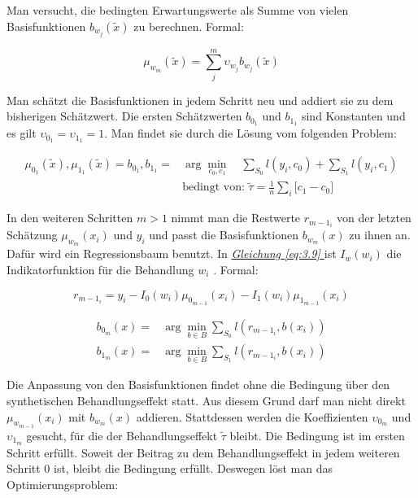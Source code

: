 \documentclass[12pt,a4paper,twoside]{scrartcl}
\numberwithin{equation}{section}
\renewcommand*{\refeq}[1]{\emph{\hyperref[#1]{Gleichung \ref*{#1} }}}
\begin{document}
\noindent
Man versucht, die bedingten Erwartungswerte als Summe von vielen Basisfunktionen $b_{w_j}(\tilde{x})$ zu berechnen. Formal:\par

\begin{equation}\label{eq:3.7}
 \mu_{w_m}(\tilde{x}) = \sum_j^m \upsilon_{w_j}b_{w_j}(\tilde{x})
\end{equation}

\noindent
Man schätzt die Basisfunktionen in jedem Schritt neu und addiert sie zu dem bisherigen Schätzwert. Die ersten Schätzwerten $b_{0_1}$ und $b_{1_1}$ sind Konstanten und es gilt $\upsilon_{0_1} = \upsilon_{1_1} = 1$. Man findet sie durch die Lösung vom folgenden Problem\cite{schuler2017synth}: \par 

\begin{equation}\label{eq:3.8}
\begin{split}
	\mu_{0_1}(\tilde{x}),\mu_{1_1}(\tilde{x}) = b_{0_1},b_{1_1} = &\arg\min_{c_0,c_1} \quad \sum_{S_0} l(y_i,c_0) + \sum_{S_1} l(y_i,c_1)\\
 &\text{bedingt von: } \tilde{\tau} = \frac{1}{n} \sum_i \big [c_1 - c_0 \big ]
\end{split}
\end{equation}

\noindent
In den weiteren Schritten $m>1$ nimmt man die Restwerte $r_{{m-1}_i}$ von der letzten Schätzung $\mu_{w_m}(x_i)$ und $y_i$ und passt die Basisfunktionen $b_{w_m}(x)$ zu ihnen an. Dafür wird ein Regressionsbaum benutzt. In \refeq{eq:3.9} ist $I_w(w_i)$ die Indikatorfunktion für die Behandlung $w_i$ \cite{schuler2017synth}. Formal:\par

\begin{equation}\label{eq:3.9}
r_{{m-1}_i} = y_i - I_0(w_i)\mu_{0_{m-1}}(x_i)-I_1(w_i)\mu_{1_{m-1}}(x_i)
\end{equation}

\begin{equation}\label{eq:3.10}
\begin{split}
	 b_{0_m}(x) = &\arg\min_{b \in B} \sum_{S_0} l(r_{{m-1}_i},b(x_i))\\
	 b_{1_m}(x) = &\arg\min_{b \in B} \sum_{S_1} l(r_{{m-1}_i},b(x_i))
\end{split}
\end{equation}

\noindent
Die Anpassung von den Basisfunktionen findet ohne die Bedingung über den synthetischen Behandlungseffekt statt. Aus diesem Grund darf man nicht direkt $\mu_{w_{m-1}}(x_i)$ mit $b_{w_m}(x)$ addieren. Stattdessen werden die Koeffizienten $\upsilon_{0_m}$ und $\upsilon_{1_m}$ gesucht, für die der Behandlungseffekt $\tilde{\tau}$ bleibt. Die Bedingung ist im ersten Schritt erfüllt. Soweit der Beitrag zu dem Behandlungseffekt in jedem weiteren Schritt $0$ ist, bleibt die Bedingung erfüllt\cite{schuler2017synth}. Deswegen löst man das Optimierungsproblem:\par 
\end{document}
